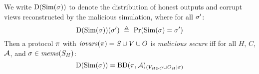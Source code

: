 \begin{definition}
  We write $\mathrm{D}(\mathrm{Sim}(\sigma))$ to
  denote the distribution of honest outputs and corrupt views reconstructed by the
  malicious simulation, where for
  all $\sigma'$:
  $$
  \dist(\SIM(\store))(\store')\ \defeq\ \prob(\SIM(\store) = \store') 
  $$
  Then a protocol $\pi$ with $\mathit{iovars}(\pi) = S \cup V \cup O$ is \emph{malicious
  secure} iff for all $H$, $C$, $\mathcal{A}$, and $\sigma \in \mathit{mems}(S_H)$:
  $$
  \mathrm{D}(\mathrm{Sim}(\sigma)) = \mathrm{BD}(\pi,\mathcal{A})_{({V_{H \rhd C} \cup O_H}|{\sigma})}
  $$  
\end{definition}
